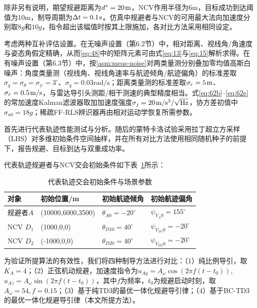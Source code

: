 除非另有说明，期望规避距离为${d^*} = 20{\kern 1pt} {\text{m}}$，NCV作用半径为6m，目标成功到达阈值为10m，制导周期为$\Delta t = 0.1{\kern 1pt} {\text{s}}$。仿真中规避者与NCV的可用最大法向加速度分别取$8g$和$10g$，指令超出该幅值时按其上限施加，各对比方法采用相同设定。

考虑两种互补评估设置。在无噪声设置（第6.2节）中，相对距离、视线角/角速度与姿态角假定精确，从而\eqref{eq:48}中的矩阵元素可由式\eqref{eq:13}与\eqref{eq:15}解析求得。在有噪声设置（第6.3节）中，按\cref{asm:meas-noise}对两类量测分别叠加零均值高斯白噪声：角度类量测（视线角、视线角速率与航迹倾角/航迹偏角）的标准差取${\sigma _q} = {\sigma _\theta } = {\sigma _\psi } = {3^ \circ }$、${\sigma _{\dot q}} = 0.03{\text{rad/s}}$；距离类量测的标准差取${\sigma _r} = 5{\kern 1pt} {\text{m}}$、${\sigma _{\dot r}} = 0.5{\kern 1pt} {\text{m/s}}$，与雷达导引头测距/相干测速的典型精度相当。式\eqref{eq:62b}--\eqref{eq:62e}的常加速度Kalman滤波器取加加速度强度${\sigma _j} = 20{\kern 1pt} {\text{m/}}{{\text{s}}^{\text{3}}}{\text{/}}\sqrt {{\text{Hz}}} $，协方差初值中${\sigma _{a0}} = 18g$；稀疏FF-RLS辨识器再由相对运动学恢复所需参数。

首先进行代表轨迹性能测试与分析。随后的蒙特卡洛试验采用拉丁超立方采样（LHS）对多维初始条件空间抽样，并在所有对比方法使用相同随机种子的前提下，报告规避、目标到达与双重成功率。

代表轨迹规避者与NCV交会初始条件如下表~\ref{tab:init-traj}所示：

\begin{table}[htbp]
\centering
\caption{代表轨迹交会初始条件与场景参数}
\label{tab:init-traj}
\small
\begin{tabularx}{\linewidth}{lXXX}
\toprule
对象 & 初始位置/m & 初始航迹倾角 & 初始航迹偏角 \\
\midrule
规避者$A$ & (10000,6000,3500) & ${\theta _{A0}} =  - {20^ \circ }$ & ${\psi _{{V_A}0}} = {155^ \circ }$ \\
NCV ${D_1}$ & (1000,0,0) & ${\theta _{D10}} = {40^ \circ }$ & ${\psi _{{V_{D1}}0}} =  - {20^ \circ }$ \\
NCV ${D_2}$ & (-1000,0,0) & ${\theta _{D20}} = {40^ \circ }$ & ${\psi _{{V_{D2}}0}} =  - {20^ \circ }$ \\
\bottomrule
\end{tabularx}
\end{table}
为验证所提算法的有效性，我们将四种制导方法进行对比：（1）纯比例导引，取${K_A} = 4$；（2）正弦机动规避，加速度指令为${u_{Ay}} = {A_\omega }\cos (2\pi f(t - {t_0}))$, ${u_{Az}} = {A_\omega }\sin (2\pi f(t - {t_0}))$，其中$f$为频率，${t_0}$为规避启动时刻，取${A_\omega } = 54,f = 0.15$；（3）基于纯TD3的最优一体化规避导引律；（4）基于BC-TD3的最优一体化规避导引律（本文所提方法）。

